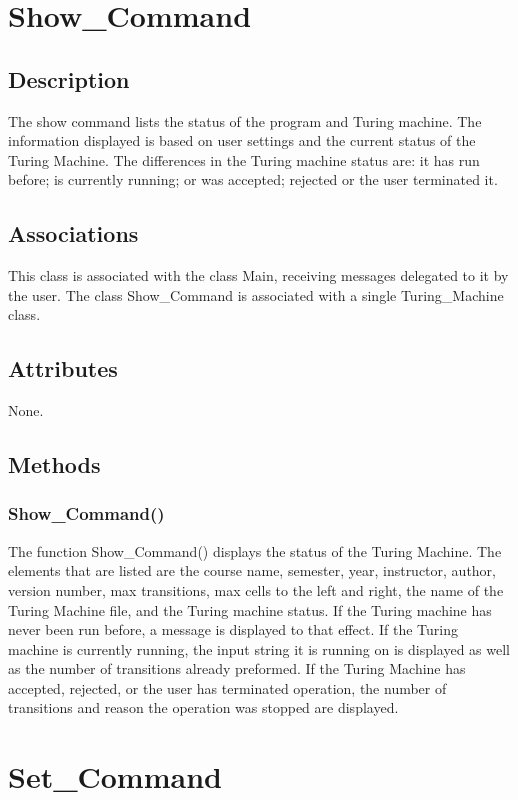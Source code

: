 \documentclass{report}
\begin{document}
    
\section{Show\_Command}
	\subsection{Description}
    The show command lists the status of the program and Turing machine. The information displayed is based on user settings and the current status of the Turing Machine. The differences in the Turing machine status are: it has run before; is currently running; or was accepted; rejected or the user terminated it.
    \subsection{Associations} 
    This class is associated with the class Main, receiving messages delegated to it by the user.
      The class Show\_Command is associated with a single Turing\_Machine class.
    \subsection{Attributes}
    None.
    \subsection{Methods} 
    \subsubsection{Show\_Command()}
    The function Show\_Command() displays the status of the Turing Machine. The elements that are listed are the course name, semester, year, instructor, author, version number, max transitions, max cells to the left and right, the name of the Turing Machine file, and the Turing machine status. If the Turing machine has never been run before, a message is displayed to that effect. If the Turing machine is currently running, the input string it is running on is displayed as well as the number of transitions already preformed. If the Turing Machine has accepted, rejected, or the user has terminated operation, the number of transitions and reason the operation was stopped are displayed.    
    
    
    
\section{Set\_Command}
\end{document}
